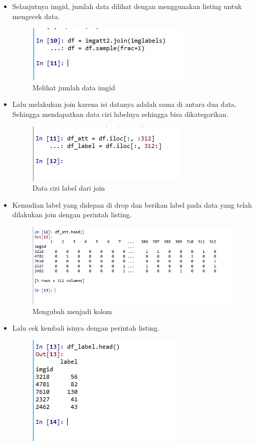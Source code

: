 \begin{enumerate}
\begin{itemize}
		\item Selanjutnya imgid, jumlah data dilihat dengan menggunakan listing untuk mengecek data.
			\begin{figure}[!hbtp]
			\centering
			\includegraphics[scale=0.5]{figures/AIP/ai16.PNG}
			\caption{Melihat jumlah data imgid}
			\label{contoh}
			\end{figure}
		\item Lalu melakukan join karena isi datanya adalah sama di antara dua data. Sehingga mendapatkan data ciri labelnya sehingga bisa dikategorikan.
			\begin{figure}[!hbtp]
			\centering
			\includegraphics[scale=0.5]{figures/AIP/ai17.PNG}
			\caption{Data ciri label dari join}
			\label{contoh}
			\end{figure}
		\item Kemudian label yang didepan di drop dan berikan label pada data yang telah dilakukan join dengan perintah listing.
			\begin{figure}[!hbtp]
			\centering
			\includegraphics[scale=0.5]{figures/AIP/ai18.PNG}
			\caption{Mengubah menjadi kolom}
			\label{contoh}
			\end{figure}
		\item Lalu cek kembali isinya dengan perintah listing. 
			\begin{figure}[!hbtp]
			\centering
			\includegraphics[scale=0.5]{figures/AIP/ai19.PNG}

\end{figure}
\end{itemize}
\end{enumerate}
